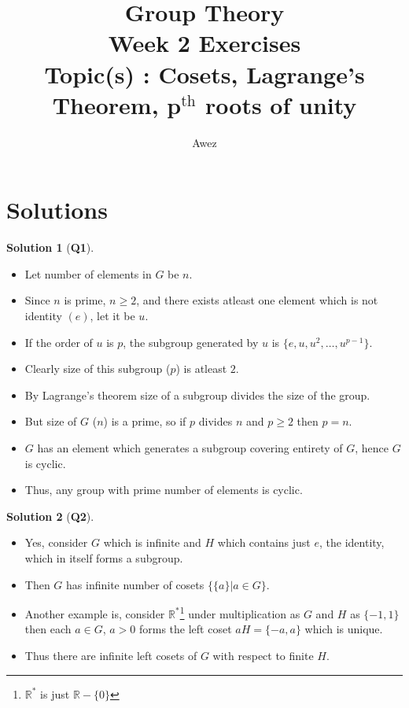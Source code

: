 \documentclass{article}
\title{\textbf{Group Theory} \\ Week 2 Exercises \\
{\large Topic(s) : Cosets, Lagrange's Theorem, p$^\text{th}$ roots of unity}}
\author{Awez}
\date{}
\theoremstyle{definition}
\newtheorem*{sol}{Solution}
\begin{document}
\maketitle

\section{Solutions}
\begin{sol}[\textbf{Q1}]

	\begin{itemize}
		\item Let number of elements in $G$ be $n$.
		\item Since $n$ is prime, $ n\geq 2$, and there exists atleast
		      one element which is not identity $\left(e\right)$, let it
		      be $u$.
		\item 	If the order of $u$ is $p$, the subgroup generated by
		      $u$ is $\{e,u,u^2,\dots,u^{p-1}\}$.
		\item 	Clearly size of this subgroup ($p$) is atleast
		      $2$.
		\item 	By Lagrange's theorem size of a subgroup divides the size of the group.
		\item 	But size of $G$ ($n$) is a prime, so if $p$ divides $n$ and $p\geq 2$ then $p=n$.
		\item 	$G$ has an element which generates a subgroup covering entirety of $G$, hence $G$ is cyclic.
		\item 	Thus, any group with prime number of elements is cyclic.
	\end{itemize}
\end{sol}

\begin{sol}[\textbf{Q2}]
	\begin{itemize}
		\item 	Yes, consider $G$ which is infinite and $H$ which contains just
		      $e$, the identity, which in itself forms a subgroup.
		\item 	Then $G$ has infinite number of cosets $\{
			      \{a\} | a\in G \}$.
		\item 	Another example is, consider
		      $\mathbb{R}^*$\footnote{$\mathbb{R}^*$ is just
			      $\mathbb{R}-\{0\}$} under multiplication as $G$
		      and $H$ as $\{-1,1\}$ then each $a\in G$, $a > 0$
		      forms the left coset $aH=\{-a,a\}$ which is
		      unique.
		\item 	Thus there are infinite left cosets of $G$ with respect to finite $H$.
	\end{itemize}
\end{sol}
\end{document}
